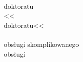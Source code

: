 \documentclass[a4paper,11pt]{article}
\numberwithin{equation}{section}
\begin{document}
\VerSpaceSix


\noindent
{} \\
\Jest doktoratu \\
<< \\
\PowinnoByc doktoratu<< \\
 \\
\Jest obsługi skomplikowanego \\
\PowinnoByc obsługi \\














\printbibliography





\end{document}
